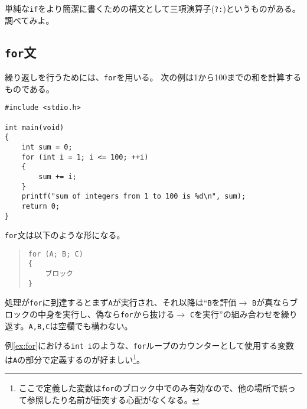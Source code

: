 単純な\texttt{if}をより簡潔に書くための構文として三項演算子(\texttt{?:})というものがある。調べてみよ。

\subsection{\texttt{for}文}
繰り返しを行うためには、\texttt{for}を用いる。
次の例は1から100までの和を計算するものである。
\begin{reidai}\label{ex:for}
\begin{verbatim}
#include <stdio.h>

int main(void)
{
    int sum = 0;
    for (int i = 1; i <= 100; ++i)
    {
        sum += i;
    }
    printf("sum of integers from 1 to 100 is %d\n", sum);
    return 0;
}
\end{verbatim}
\end{reidai} \noindent
\texttt{for}文は以下のような形になる。
\begin{quote}
\begin{verbatim}
for (A; B; C)
{
    ブロック
}
\end{verbatim}
\end{quote}
処理が\texttt{for}に到達するとまず\texttt{A}が実行され、それ以降は``\texttt{B}を評価\(\rightarrow\) \texttt{B}が真ならブロックの中身を実行し、偽なら\texttt{for}から抜ける\(\rightarrow\) \texttt{C}を実行''の組み合わせを繰り返す。\texttt{A,B,C}は空欄でも構わない。

例\ref{ex:for}における\texttt{int i}のような、\texttt{for}ループのカウンターとして使用する変数は\texttt{A}の部分で定義するのが好ましい\footnote{ここで定義した変数は\texttt{for}のブロック中でのみ有効なので、他の場所で誤って参照したり名前が衝突する心配がなくなる。}。

